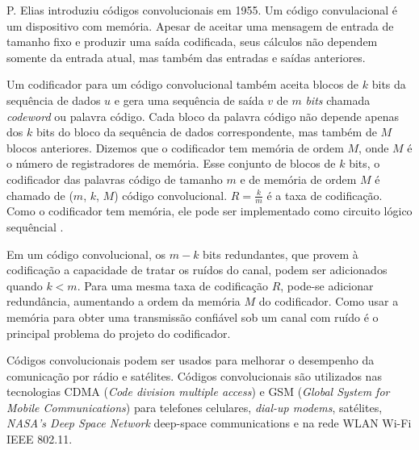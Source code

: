 P. Elias introduziu códigos convolucionais em 1955. Um código convulacional é um dispositivo com memória. Apesar de aceitar uma mensagem de entrada de tamanho fixo e produzir uma saída codificada, seus cálculos não dependem somente da entrada atual, mas também das entradas e saídas anteriores.

Um codificador para um código convolucional também aceita blocos de $k$ bits da sequência de dados $u$ e gera uma sequência de saída $v$ de $m$ \emph{bits} chamada \emph{codeword} ou palavra código. Cada bloco da palavra código não depende apenas dos $k$ bits do bloco da sequência de dados correspondente, mas também de $M$ blocos anteriores. Dizemos que o codificador tem memória de ordem $M$, onde $M$ é o número de registradores de memória. Esse conjunto de blocos de $k$ bits, o codificador das palavras código de tamanho $m$ e de memória de ordem $M$ é chamado de ($m$, $k$, $M$) código convolucional. $R = \frac{k}{m}$  é a taxa de codificação. Como o codificador tem memória, ele pode ser implementado como circuito lógico sequêncial \cite{Lin:1983}.

Em um código convolucional, os $m - k$ bits redundantes, que provem à codificação a capacidade de tratar os ruídos do canal, podem ser adicionados quando $k < m$. Para uma mesma taxa de codificação $R$, pode-se adicionar redundância, aumentando a ordem da memória $M$ do codificador. Como usar a memória para obter uma transmissão confiável sob um canal com ruído é o principal problema do projeto do codificador.

Códigos convolucionais podem ser usados para melhorar o desempenho da comunicação por rádio e satélites. Códigos convolucionais são utilizados nas tecnologias CDMA (\emph{Code division multiple access}) e GSM (\emph{Global System for Mobile Communications}) para telefones celulares, \emph{dial-up modems}, satélites, \emph{NASA's Deep Space Network} deep-space communications e na rede WLAN Wi-Fi IEEE 802.11.


